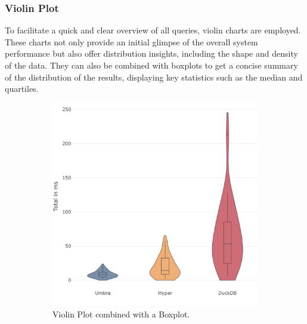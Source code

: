 \subsubsection{Violin Plot}

To facilitate a quick and clear overview of all queries, violin charts are employed. These charts not only provide an initial glimpse of the overall system performance but also offer distribution insights, including the shape and density of the data. They can also be combined with boxplots to get a concise summary of the distribution of the results, displaying key statistics such as the median and quartiles.



\begin{figure}[h]
  \centering
  \begin{subfigure}[b]{0.4\linewidth}
    \includegraphics[width=\linewidth]{figures/bsp-violin-boxplot.png}
    \caption{Violin Plot combined with a Boxplot.}
      \label{fig:violin-boxplot}
  \end{subfigure}
  \hspace{1cm} %
  \begin{subfigure}[b]{0.4\linewidth}

\end{subfigure}
\end{figure}
